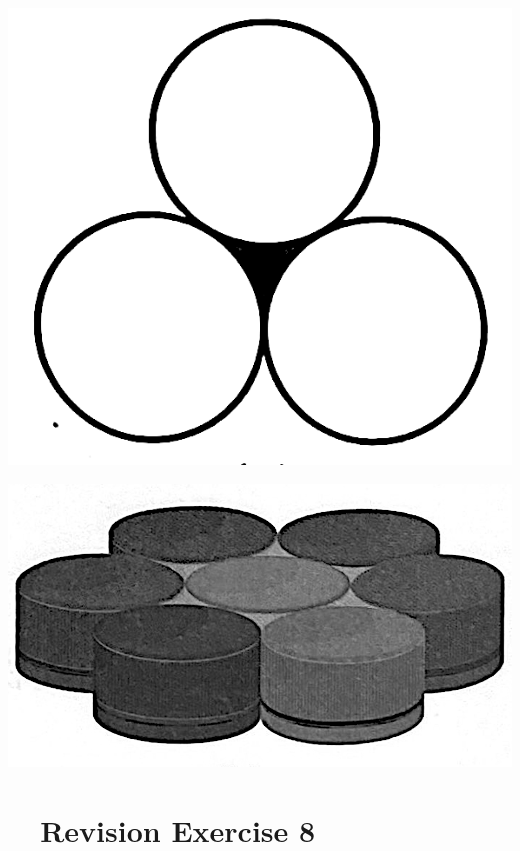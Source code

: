 \documentclass{report}
\newcommand{\revision}[1]{%
    \section*{\faGears\ \ Revision Exercise #1\hspace{0.5em}\xrfill[0.175\baselineskip]{1pt}}
}
\begin{document}
\begin{enumerate}
\begin{multicols}{2}
\begin{enumerate}
            \begin{center}
                \includegraphics[scale=0.14]{assets/8-29.png}
            \end{center}
            \begin{center}
                \includegraphics[scale=0.14]{assets/8-30.png}
            \end{center}
        \end{enumerate}
    \end{multicols}
\end{enumerate}

\newpage

\revision{8}
\end{document}
